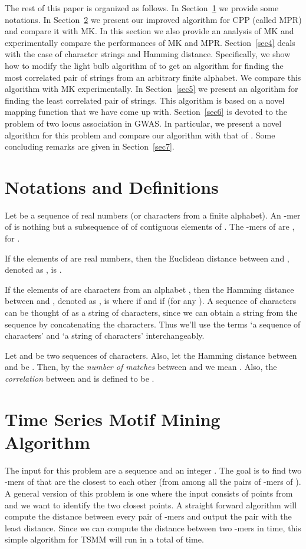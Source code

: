 \documentclass{article}
\theoremstyle{definition}
\theoremstyle{remark}
\begin{document}
The rest of this paper is organized as follows. In Section~\ref{sec2} we provide some notations. In Section~\ref{sec3} we present our improved algorithm for CPP (called MPR) and compare it with MK. In this section we also provide an analysis of MK and experimentally compare the performances of MK and MPR. Section~\ref{sec4} deals with the case of character strings and Hamming distance. Specifically, we show how to modify the light bulb algorithm of \cite{RSJ89} to get an algorithm for finding the most correlated pair of strings from an arbitrary finite alphabet. We compare this algorithm with MK experimentally. In Section~\ref{sec5} we present an algorithm for finding the least correlated pair of strings. This algorithm is based on a novel mapping function that we have come up with. Section~\ref{sec6} is devoted to the problem of two locus association in GWAS. In particular, we present a novel algorithm for this problem and compare our algorithm with that of \cite{PBK11}. Some concluding remarks are given in Section~\ref{sec7}.

\section{Notations and Definitions}\label{sec2}
Let  be a sequence of real numbers (or characters from a finite alphabet). An -mer of  is nothing but a subsequence of  of  contiguous elements of . The -mers of  are , for .

If the elements of  are real numbers, then the Euclidean distance between  and , denoted as , is .

If the elements of  are characters from an alphabet , then the Hamming distance between  and , denoted as , is  where  if  and  if  (for any ). A sequence of characters can be thought of as a string of characters, since we can obtain a string from the sequence by concatenating the characters. Thus we'll use the terms `a sequence of characters' and `a string of characters' interchangeably.

Let  and  be two sequences of characters. Also, let the Hamming distance between  and  be . Then, by the {\em number of matches} between  and  we mean . Also, the {\em correlation} between  and  is defined to be .

\section{Time Series Motif Mining Algorithm}\label{sec3}
The input for this problem are a sequence  and an integer . The goal is to find two -mers of   that are the closest to each other (from among all the pairs of -mers of ). A general version of this problem is one where the input consists of  points from  and we want to identify the two closest points.
A straight forward algorithm will compute the distance between every pair of -mers and output the pair with the least distance. Since we can compute the distance between two -mers in  time, this simple algorithm for TSMM will run in a total of  time.
\end{document}
